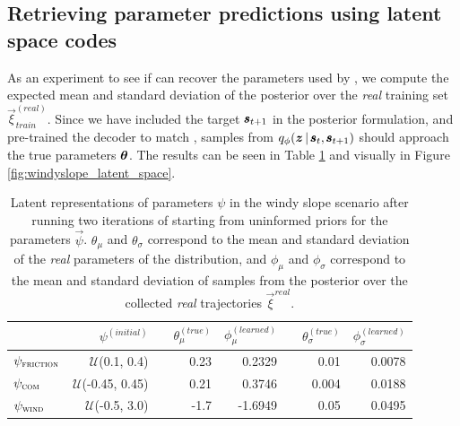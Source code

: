 
\subsection{Retrieving parameter predictions using latent space codes}

As an experiment to see if \dettostoc{} can recover the parameters used by \fsimulator{}, we compute the expected mean and standard deviation of the posterior over the \emph{real} training set $\vec{\xi}^{(real)}_{train}$. Since we have included the target $\pmb{s}_{t+1}$ in the posterior formulation, and pre-trained the decoder to match \fsimulator{}, samples from $\qphi \given{\vz}{\vs, \vns}$ should approach the true parameters $\boldsymbol{\theta}$. The results can be seen in Table \ref{fig_3_parameters_table} and visually in Figure \ref{fig:windyslope_latent_space}.

\begin{table}
\centering
\begin{tabular}{lrcrrcrr}
\toprule
& $\psi^{(initial)}$ && $\theta_\mu^{(true)}$ & $\phi_\mu^{(learned)}$ && $\theta_\sigma^{(true)}$ & $\phi_\sigma^{(learned)}$ \\
\midrule
$\psi_{\textsc{friction}}$ & $\mathcal{U}$(0.1, 0.4) && 0.23 & 0.2329 && 0.01 & 0.0078 \\
$\psi_{\textsc{com}}$ & $\mathcal{U}$(-0.45, 0.45) && 0.21 & 0.3746 && 0.004 & 0.0188 \\
$\psi_{\textsc{wind}}$ & $\mathcal{U}$(-0.5, 3.0) && -1.7 & -1.6949 && 0.05 & 0.0495 \\
\bottomrule
\end{tabular}
\caption{Latent representations of parameters $\psi$ in the windy slope scenario after running two iterations of \dettostoc{} starting from uninformed priors for the parameters $\vec{\psi}$. $\theta_\mu$ and $\theta_\sigma$ correspond to the mean and standard deviation of the \emph{real} parameters of the distribution, and $\phi_\mu$ and $\phi_\sigma$ correspond to the mean and standard deviation of samples from the posterior over the collected \emph{real} trajectories $\vec{\xi}^{real}$.}
\label{fig_3_parameters_table}
\end{table}


